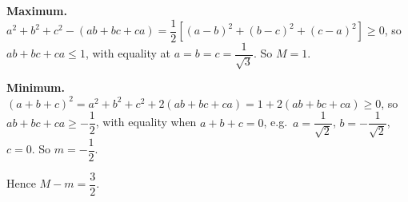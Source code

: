 \textbf{Maximum.} $a^2+b^2+c^2-(ab+bc+ca)=\dfrac{1}{2}\left[(a-b)^2+(b-c)^2+(c-a)^2\right]\ge0$, so $ab+bc+ca\le1$, with equality at $a=b=c=\dfrac{1}{\sqrt3}$. So $M=1$.

\textbf{Minimum.} $(a+b+c)^2=a^2+b^2+c^2+2(ab+bc+ca)=1+2(ab+bc+ca)\ge0$, so $ab+bc+ca\ge-\dfrac{1}{2}$, with equality when $a+b+c=0$, e.g.\ $a=\dfrac{1}{\sqrt2}$, $b=-\dfrac{1}{\sqrt2}$, $c=0$. So $m=-\dfrac{1}{2}$.

Hence $M-m=\boxed{\dfrac{3}{2}}$.
